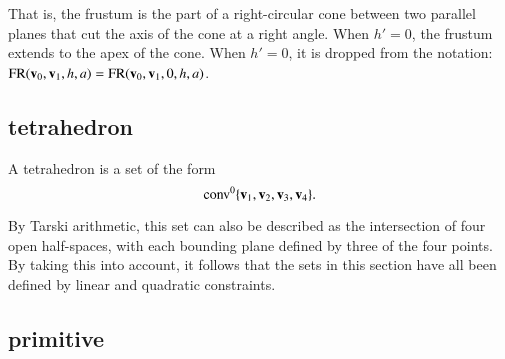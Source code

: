 That is, the frustum is the part of a right-circular cone between two
parallel planes that cut the axis of the cone at a right angle.
When $h'=0$, the frustum extends to the apex of the cone.
When $h'=0$, it is dropped from the notation: ${\operatorname{FR}}({\mathbf v}_0,{\mathbf v}_1,h,a)={\operatorname{FR}}({\mathbf v}_0,{\mathbf v}_1,0,h,a)$.

\subsection{tetrahedron}
%

\begin{definition}[tetrahedron] A tetrahedron is a set of the form
\begin{displaymath}{\operatorname{conv}}^0\{{\mathbf v}_1,{\mathbf v}_2,{\mathbf v}_3,{\mathbf v}_4\}.\end{displaymath}
%
\end{definition}

By Tarski arithmetic, %
this set can also be described
as the intersection of four open half-spaces, with each bounding
plane defined by three of the four points.
By taking this into account, it follows that
the sets in this section have all been defined by linear and quadratic
constraints.
%

\subsection{primitive}
%

